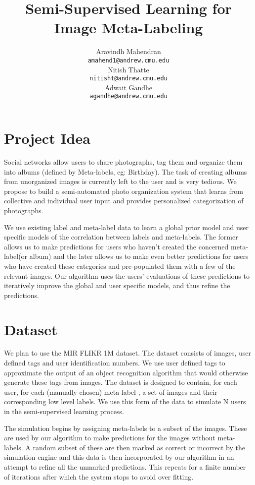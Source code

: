 \documentclass{article} %
\title{Semi-Supervised Learning for Image Meta-Labeling}
\author{
Aravindh Mahendran \\
\texttt{amahend1@andrew.cmu.edu} \\ 
\And
Nitish Thatte \\
\texttt{nitisht@andrew.cmu.edu} \\
\AND
Adwait Gandhe \\
\texttt{agandhe@andrew.cmu.edu} \\
}
\begin{document}
\vspace{-0.5in}
\maketitle
\vspace{-0.5in}
\section{Project Idea}
Social networks allow users to share photographs, tag them and organize them into albums (defined by Meta-labels, eg: Birthday). The task of creating albums from unorganized images is currently left to the user and is very tedious. We propose to build a semi-automated photo organization system that learns from collective and individual user input and provides personalized categorization of photographs. 

We use existing label and meta-label data to learn a global prior model and user specific models of the correlation between labels and meta-labels. The former allows us to make predictions for users who haven't created the concerned meta-label(or album) and the later allows us to make even better predictions for users who have created these categories and pre-populated them with a few of the relevant images. Our algorithm uses the users' evaluations of these predictions to iteratively improve the global and user specific models, and thus refine the predictions.

\section{Dataset}
We plan to use the MIR FLIKR 1M dataset. The dataset consists of images, user defined tags and user identification numbers. 
We use user defined tags to approximate the output of an object recognition algorithm that would otherwise generate these tags from images.
The dataset is designed to contain, for each user, for each (manually chosen) meta-label , a set of images and their corresponding low level labels. We use this form of the data to simulate N users in the semi-supervised learning process. 

The simulation begins by assigning meta-labels to a subset of the images. These are used by our algorithm to make predictions for the images without meta-labels. A random subset of these are then marked as correct or incorrect by the simulation engine and this data is then incorporated by our algorithm in an attempt to refine all the unmarked predictions. This repeats for a finite number of iterations after which the system stops to avoid over fitting.
\end{document}
